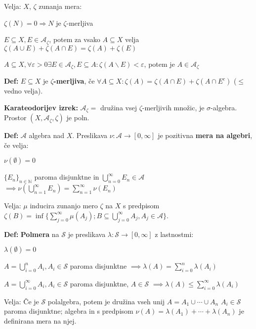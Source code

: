 \documentclass[a4paper,oneside,10pt]{article}
\theoremstyle{definition}
\newcommand{\N}{\ensuremath{\mathbb{N}}}
\newenvironment{itemize*}{\vspace{-10pt}\begin{itemize}\setlength{\itemsep}{0pt}\setlength{\parskip}{2pt}}{\end{itemize}}
\newcommand{\A}{\ensuremath{\mathcal{A}}}
\renewcommand{\S}{\ensuremath{\mathcal{S}}}
\begin{document}
Velja: $X$, $\zeta$ zunanja mera:
\begin{itemize*}
  \item $\zeta (N) = 0 \Rightarrow N$ je $\zeta$-merljiva
  \item $E \subseteq X, E \in \A_{\zeta}$, potem za vsako $A \subseteq X$ velja
    $\zeta(A \cup E) + \zeta(A \cap E) = \zeta(A) + \zeta(E)$
  \item $A \subseteq X, \forall \varepsilon > 0 \exists E \in \A_{\zeta}, E
    \subseteq A: \zeta(A \backslash E) < \varepsilon$, potem je $A \in
    \A_{\zeta}$
\end{itemize*}

\textbf{Def:} $E \subseteq X$ je \textbf{$\zeta$-merljiva}, če
$\forall A \subseteq X: \zeta(A) = \zeta(A \cap E) + \zeta(A \cap E^c)$ ($\leq$
vedno velja).

\textbf{Karateodorijev izrek:}
$\A_{\zeta} = $ družina vsej $\zeta$-merljivih množic, je $\sigma$-algebra.
Prostor $(X, \A_{\zeta}, \zeta)$ je poln.

\textbf{Def:} \A{} algebra nad $X$. Preslikava $\nu \colon \A \to [0, \infty]$
je pozitivna \textbf{mera na algebri}, če velja:
\begin{itemize*}
  \item $\nu(\emptyset) = 0$
  \item $\{E_n\}_{n \in \N}$ paroma disjunktne in $\bigcup_{n=0}^\infty E_n \in \A$
    $\implies \nu(\bigcup_{n = 1}^\infty E_n) = \sum_{n = 1}^\infty \nu(E_n)$
\end{itemize*}

Velja: $\mu$ inducira zunanjo mero $\zeta$ na $X$ s predpisom \\ $\zeta(B) =
\inf\{ \sum_{j=0}^\infty \mu(A_j); B \subseteq \bigcup_{j=0}^\infty A_j, A_j \in
\A \}$.

\textbf{Def:} \textbf{Polmera} na \S{} je preslikava $\lambda\colon\S\to[0,
\infty]$ z lastnostmi:
\begin{itemize*}
  \item $\lambda(\emptyset) = 0$
  \item $A = \bigcup_{i=0}^n A_i, A_i \in \S$ paroma disjunktne $\implies
    \lambda(A) = \sum_{i=0}^n \lambda(A_i)$
  \item $A = \bigcup_{i=0}^\infty A_i, A_i \in \S$ paroma disjunktne, $A \in \S$
    $\implies \lambda(A) \leq \sum_{i=0}^\infty \lambda(A_i)$
\end{itemize*}

Velja: Če je $\S$ polalgebra, potem je družina vseh unij $A = A_1 \cup \cdots \cup A_n$
$A_i \in \S$ paroma disjunktne; algebra in s predpisom
$\nu(A) = \lambda(A_1) + \cdots + \lambda(A_n)$ je definirana mera na njej.
\end{document}
